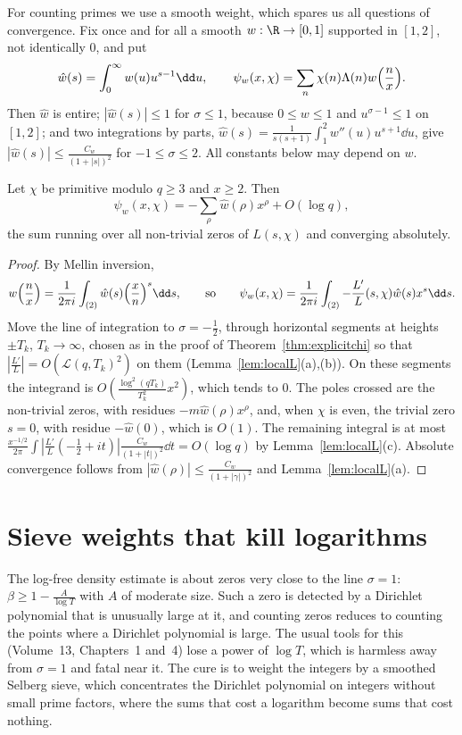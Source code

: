 For counting primes we use a smooth weight, which spares us all questions of convergence. Fix once and for all a smooth $w:\R\to[0,1]$ supported in $[1,2]$, not identically $0$, and put
\[
\hat w(s)=\int_0^\infty w(u)u^{s-1}\dd u,\qquad\psi_w(x,\chi)=\sum_n\chi(n)\Lambda(n)w\Bigl(\frac nx\Bigr).
\]
Then $\hat w$ is entire; $|\hat w(s)|\le1$ for $\sigma\le1$, because $0\le w\le1$ and $u^{\sigma-1}\le1$ on $[1,2]$; and two integrations by parts, $\hat w(s)=\frac1{s(s+1)}\int_1^2w''(u)u^{s+1}\dd u$, give $|\hat w(s)|\le\frac{C_w}{(1+|s|)^2}$ for $-1\le\sigma\le2$. All constants below may depend on $w$.

\begin{proposition}\label{prop:smoothexplicit}
Let $\chi$ be primitive modulo $q\ge3$ and $x\ge2$. Then
\[
\psi_w(x,\chi)=-\sum_\rho\hat w(\rho)x^\rho+O(\log q),
\]
the sum running over all non-trivial zeros of $L(s,\chi)$ and converging absolutely.
\end{proposition}
\begin{proof}
By Mellin inversion,
\[
w\Bigl(\frac nx\Bigr)=\frac1{2\pi i}\int_{(2)}\hat w(s)\Bigl(\frac xn\Bigr)^s\dd s,\qquad\text{so}\qquad\psi_w(x,\chi)=\frac1{2\pi i}\int_{(2)}-\frac{L'}L(s,\chi)\hat w(s)x^s\dd s.
\]
Move the line of integration to $\sigma=-\frac12$, through horizontal segments at heights $\pm T_k$, $T_k\to\infty$, chosen as in the proof of Theorem~\ref{thm:explicitchi} so that $|\frac{L'}L|=O(\mathcal L(q,T_k)^2)$ on them (Lemma~\ref{lem:localL}(a),(b)). On these segments the integrand is $O(\frac{\log^2(qT_k)}{T_k^2}x^2)$, which tends to $0$. The poles crossed are the non-trivial zeros, with residues $-m\hat w(\rho)x^\rho$, and, when $\chi$ is even, the trivial zero $s=0$, with residue $-\hat w(0)$, which is $O(1)$. The remaining integral is at most $\frac{x^{-1/2}}{2\pi}\int|\frac{L'}L(-\frac12+it)|\frac{C_w}{(1+|t|)^2}\dd t=O(\log q)$ by Lemma~\ref{lem:localL}(c). Absolute convergence follows from $|\hat w(\rho)|\le\frac{C_w}{(1+|\gamma|)^2}$ and Lemma~\ref{lem:localL}(a).
\end{proof}

\section{Sieve weights that kill logarithms}

The log-free density estimate is about zeros very close to the line $\sigma=1$: $\beta\ge1-\frac A{\log T}$ with $A$ of moderate size. Such a zero is detected by a Dirichlet polynomial that is unusually large at it, and counting zeros reduces to counting the points where a Dirichlet polynomial is large. The usual tools for this (Volume~13, Chapters~1 and~4) lose a power of $\log T$, which is harmless away from $\sigma=1$ and fatal near it. The cure is to weight the integers by a smoothed Selberg sieve, which concentrates the Dirichlet polynomial on integers without small prime factors, where the sums that cost a logarithm become sums that cost nothing.

